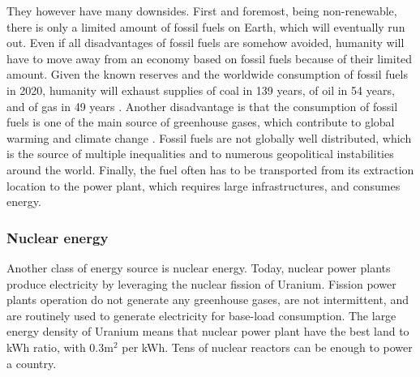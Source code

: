 \documentclass[my_thesis.tex]{subfiles}
\begin{document}
They however have many downsides. First and foremost, being non-renewable, there is only a limited amount of fossil fuels on Earth, which will eventually run out. Even if all disadvantages of fossil fuels are somehow avoided, humanity will have to move away from an economy based on fossil fuels because of their limited amount. Given the known reserves and the worldwide consumption of fossil fuels in 2020, humanity will exhaust supplies of coal in 139 years, of oil in 54 years, and of gas in 49 years \citep{bpBPStatisticalReview2020}. Another disadvantage is that the consumption of fossil fuels is one of the main source of greenhouse gases, which contribute to global warming and climate change \citep{allanIPCC2021Summary}. Fossil fuels are not globally well distributed, which is the source of multiple inequalities and to numerous geopolitical instabilities around the world. Finally, the fuel often has to be transported from its extraction location to the power plant, which requires large infrastructures, and consumes energy.

\subsubsection{Nuclear energy}
Another class of energy source is nuclear energy. Today, nuclear power plants produce electricity by leveraging the nuclear fission of Uranium. Fission power plants operation do not generate any greenhouse gases, are not intermittent, and are routinely used to generate electricity for base-load consumption. The large energy density of Uranium means that nuclear power plant have the best land to kWh ratio, with $0.3\text{m}^2$ per kWh. Tens of nuclear reactors can be enough to power a country.
\end{document}
